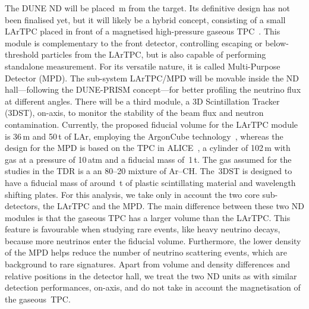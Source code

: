 The DUNE ND will be placed \,m from the target.
Its definitive design has not been finalised yet, but it will likely be a hybrid concept, %
consisting of a small LArTPC placed in front of a magnetised high-pressure gaseous TPC~\cite{DUNETDR:2019, DUNEND:2019}.
This module is complementary to the front detector, controlling escaping or below-threshold particles from the LArTPC, %
but is also capable of performing standalone measurement.
For its versatile nature, it is called Multi-Purpose Detector (MPD).
The sub-system LArTPC/MPD will be movable inside the ND hall---following the DUNE-PRISM concept---for %
better profiling the neutrino flux at different angles.
There will be a third module, a 3D Scintillation Tracker (3DST), on-axis, to monitor %
the stability of the beam flux and neutron contamination.
Currently, the proposed fiducial volume for the LArTPC module is 36\,m and 50\,t of LAr, %
employing the ArgonCube technology~\cite{Amsler:1993255}, %
whereas the design for the MPD is based on the TPC in \mbox{ALICE}~\cite{Glassel:2004jv}, %
a cylinder of 102\,m with gas at a pressure of 10\,atm and a fiducial mass of~1\,t.
The gas assumed for the studies in the TDR is a an 80--20 mixture of Ar--CH.
The~3DST is designed to have a fiducial mass of around \,t of plastic scintillating material and %
wavelength shifting plates.
For this analysis, we take only in account the two core sub-detectors, the LArTPC and the MPD.
The main difference between these two ND modules is that the gaseous TPC has a larger volume than the LArTPC.
This feature is favourable when studying rare events, like heavy neutrino decays, because more neutrinos enter the fiducial volume.
Furthermore, the lower density of the MPD helps reduce the number of neutrino scattering events, which are background to rare signatures.
Apart from volume and density differences and relative positions in the detector hall, %
we treat the two ND units as with similar detection performances, on-axis, and do not take in account the magnetisation of the gaseous~TPC. 

